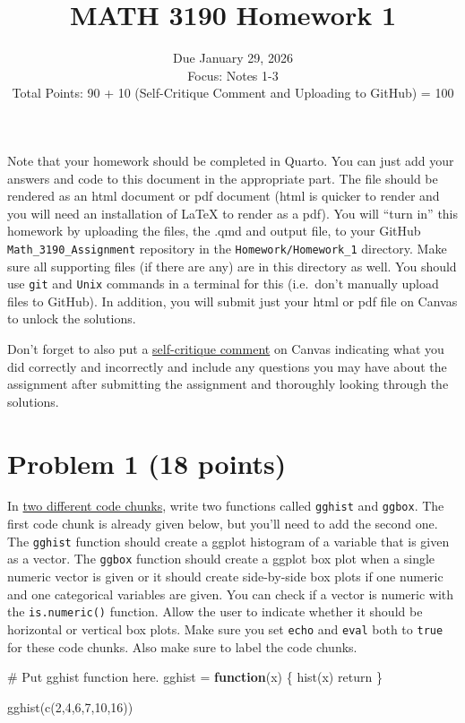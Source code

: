 \documentclass[
  letterpaper,
  DIV=11,
  numbers=noendperiod]{scrartcl}
\title{\textbf{MATH 3190 Homework 1}}
\subtitle{Due January 29, 2026\\
Focus: Notes 1-3\\
Total Points: 90 + 10 (Self-Critique Comment and Uploading to GitHub) =
100}
\author{}
\date{}
\newenvironment{Shaded}{\begin{snugshade}}{\end{snugshade}}
\newcommand{\CommentTok}[1]{\textcolor[rgb]{0.37,0.37,0.37}{#1}}
\newcommand{\ControlFlowTok}[1]{\textcolor[rgb]{0.00,0.23,0.31}{\textbf{#1}}}
\newcommand{\DecValTok}[1]{\textcolor[rgb]{0.68,0.00,0.00}{#1}}
\newcommand{\FunctionTok}[1]{\textcolor[rgb]{0.28,0.35,0.67}{#1}}
\newcommand{\NormalTok}[1]{\textcolor[rgb]{0.00,0.23,0.31}{#1}}
\newcommand{\OtherTok}[1]{\textcolor[rgb]{0.00,0.23,0.31}{#1}}
\begin{document}
\maketitle


Note that your homework should be completed in Quarto. You can just add
your answers and code to this document in the appropriate part. The file
should be rendered as an html document or pdf document (html is quicker
to render and you will need an installation of LaTeX to render as a
pdf). You will ``turn in'' this homework by uploading the files, the
.qmd and output file, to your GitHub \texttt{Math\_3190\_Assignment}
repository in the \texttt{Homework/Homework\_1} directory. Make sure all
supporting files (if there are any) are in this directory as well. You
should use \texttt{git} and \texttt{Unix} commands in a terminal for
this (i.e.~don't manually upload files to GitHub). In addition, you will
submit just your html or pdf file on Canvas to unlock the solutions.

Don't forget to also put a \ul{self-critique comment} on Canvas
indicating what you did correctly and incorrectly and include any
questions you may have about the assignment after submitting the
assignment and thoroughly looking through the solutions.

\section{Problem 1 (18 points)}\label{problem-1-18-points}

In \ul{two different code chunks}, write two functions called
\texttt{gghist} and \texttt{ggbox}. The first code chunk is already
given below, but you'll need to add the second one. The \texttt{gghist}
function should create a ggplot histogram of a variable that is given as
a vector. The \texttt{ggbox} function should create a ggplot box plot
when a single numeric vector is given or it should create side-by-side
box plots if one numeric and one categorical variables are given. You
can check if a vector is numeric with the \texttt{is.numeric()}
function. Allow the user to indicate whether it should be horizontal or
vertical box plots. Make sure you set \texttt{echo} and \texttt{eval}
both to \texttt{true} for these code chunks. Also make sure to label the
code chunks.

\begin{Shaded}
\begin{Highlighting}[]
\CommentTok{\# Put gghist function here.}
\NormalTok{gghist }\OtherTok{=} \ControlFlowTok{function}\NormalTok{(x) \{}
  \FunctionTok{hist}\NormalTok{(x)}
\NormalTok{  return}
\NormalTok{\}}

\FunctionTok{gghist}\NormalTok{(}\FunctionTok{c}\NormalTok{(}\DecValTok{2}\NormalTok{,}\DecValTok{4}\NormalTok{,}\DecValTok{6}\NormalTok{,}\DecValTok{7}\NormalTok{,}\DecValTok{10}\NormalTok{,}\DecValTok{16}\NormalTok{))}
\end{Highlighting}
\end{Shaded}
\end{document}
